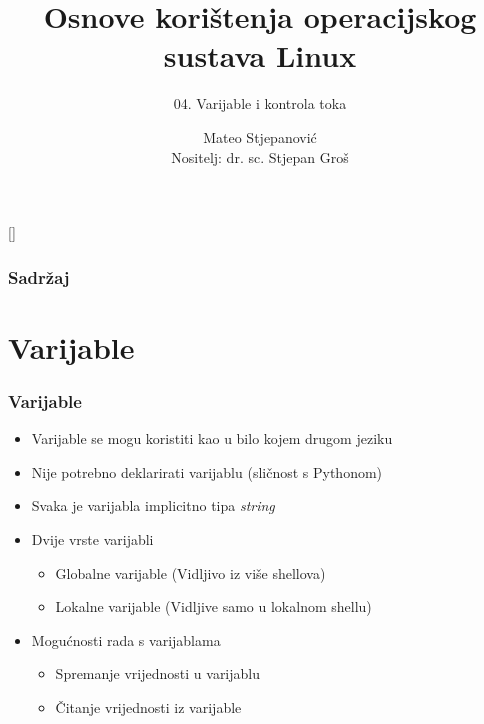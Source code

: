\documentclass{beamer}
\title{Osnove korištenja operacijskog sustava Linux}
\subtitle{04. Varijable i kontrola toka}
\author[Mateo Stjepanović]{Mateo Stjepanović\\{\small Nositelj: dr. sc. Stjepan Groš}}
\institute[FER]{Sveučilište u Zagrebu \\
				Fakultet elektrotehnike i računarstva}
\date{\todayiso}
\begin{document}
{
[] %

\begin{frame}
\maketitle
\end{frame}
}

\begin{frame}
\frametitle{Sadržaj}
\tableofcontents
\end{frame}

\section{Varijable}
\begin{frame}[t]
\frametitle{Varijable}
\begin{itemize}
	\item Varijable se mogu koristiti kao u bilo kojem drugom jeziku
	\item Nije potrebno deklarirati varijablu (sličnost s Pythonom)
 	\item Svaka je varijabla implicitno tipa \textit{string}
	\item Dvije vrste varijabli
  	\begin{itemize}
  		\item Globalne varijable (Vidljivo iz više shellova)
  		\item Lokalne varijable (Vidljive samo u lokalnom shellu)
  	\end{itemize}
  
	\item Mogućnosti rada s varijablama
 	\begin{itemize}
 		\item Spremanje vrijednosti u varijablu
		\item Čitanje vrijednosti iz varijable
	\end{itemize}
\end{itemize}
\end{frame}
\end{document}
